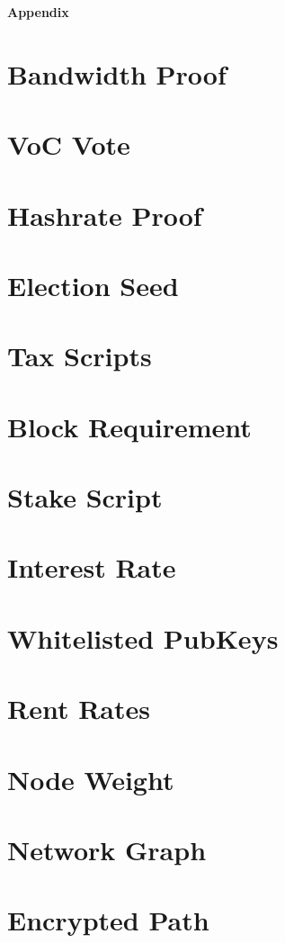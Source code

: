 \documentclass[a4paper,10pt]{article}
\begin{document}
\appendix

\noindent \Large \textbf{Appendix}

\section{Bandwidth Proof}
\section{VoC Vote}
\section{Hashrate Proof}
\section{Election Seed}
\section{Tax Scripts}
\section{Block Requirement}
\section{Stake Script}
\section{Interest Rate}
\section{Whitelisted PubKeys}
\section{Rent Rates}
\section{Node Weight}
\section{Network Graph}
\section{Encrypted Path}
\end{document}
